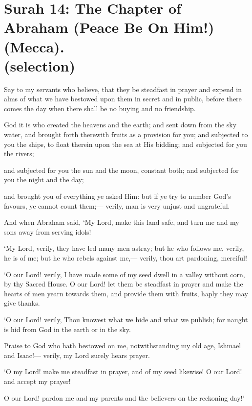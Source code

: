 \documentclass[fontsize=14pt, letterpaper, notitlepage, openany, DIV=12]{scrbook} %
\begin{document}
\section[Surah 14: The Chapter of Abraham (Peace Be On Him!) (Mecca).]{Surah 14: The Chapter of Abraham (Peace Be On Him!) (Mecca).\\ (selection)}


\noindent[14:31]
Say to my servants who believe, that they be steadfast in prayer and expend in alms of
what we have bestowed upon them in secret and in public, before there comes the day when
there shall be no buying and no friendship.

\noindent[14:32]
God it is who created the heavens and the earth; and sent down from the sky water, and
brought forth therewith fruits as a provision for you; and subjected to you the ships, to float
therein upon the sea at His bidding; and subjected for you the rivers;

\noindent[14:33]
and subjected for you the sun and the moon, constant both; and subjected for you the
night and the day;

\noindent[14:34]
and brought you of everything ye asked Him: but if ye try to number God's favours, ye
cannot count them;--- verily, man is very unjust and ungrateful.

\noindent[14:35]
And when Abraham said, `My Lord, make this land safe, and turn me and my sons away
from serving idols!

\noindent[14:36]
`My Lord, verily, they have led many men astray; but he who follows me, verily, he is of
me; but he who rebels against me,--- verily, thou art pardoning, merciful!

\noindent[14:37]
`O our Lord! verily, I have made some of my seed dwell in a valley without corn, by thy
Sacred House. O our Lord! let them be steadfast in prayer and make the hearts of men yearn
towards them, and provide them with fruits, haply they may give thanks.

\noindent[14:38]
`O our Lord! verily, Thou knowest what we hide and what we publish; for naught is hid
from God in the earth or in the sky.

\noindent[14:39]
Praise to God who hath bestowed on me, notwithstanding my old age, Ishmael and
Isaac!--- verily, my Lord surely hears prayer.

\noindent[14:40]
`O my Lord! make me steadfast in prayer, and of my seed likewise! O our Lord! and
accept my prayer!

\noindent[14:41]
O our Lord! pardon me and my parents and the believers on the reckoning day!'
\end{document}
